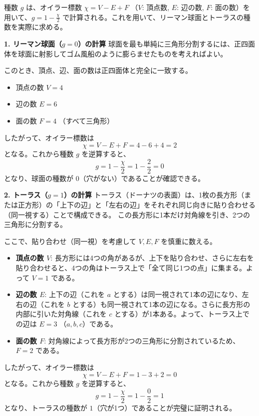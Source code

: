 \begin{example}[球面とトーラスの種数の計算]
    種数 $g$ は、オイラー標数 $\chi = V - E + F$ （$V$: 頂点数, $E$: 辺の数, $F$: 面の数）を用いて、$g = 1 - \frac{\chi}{2}$ で計算される。これを用いて、リーマン球面とトーラスの種数を実際に求める。

    \textbf{1. リーマン球面（$g=0$）の計算}
    球面を最も単純に三角形分割するには、正四面体を球面に射影してゴム風船のように膨らませたものを考えればよい。
    
    このとき、頂点、辺、面の数は正四面体と完全に一致する。
    \begin{itemize}
        \item 頂点の数 $V = 4$
        \item 辺の数 $E = 6$
        \item 面の数 $F = 4$ （すべて三角形）
    \end{itemize}
    したがって、オイラー標数は
    \[
    \chi = V - E + F = 4 - 6 + 4 = 2
    \]
    となる。これから種数 $g$ を逆算すると、
    \[
    g = 1 - \frac{\chi}{2} = 1 - \frac{2}{2} = 0
    \]
    となり、球面の種数が $0$（穴がない）であることが確認できる。

    \textbf{2. トーラス（$g=1$）の計算}
    トーラス（ドーナツの表面）は、1枚の長方形（または正方形）の「上下の辺」と「左右の辺」をそれぞれ同じ向きに貼り合わせる（同一視する）ことで構成できる。
    この長方形に1本だけ対角線を引き、2つの三角形に分割する。
    
    ここで、貼り合わせ（同一視）を考慮して $V, E, F$ を慎重に数える。
    \begin{itemize}
        \item \textbf{頂点の数 $V$}: 長方形には4つの角があるが、上下を貼り合わせ、さらに左右を貼り合わせると、4つの角はトーラス上で「全て同じ1つの点」に集まる。よって $V = 1$ である。
        \item \textbf{辺の数 $E$}: 上下の辺（これを $a$ とする）は同一視されて1本の辺になり、左右の辺（これを $b$ とする）も同一視されて1本の辺になる。さらに長方形の内部に引いた対角線（これを $c$ とする）が1本ある。よって、トーラス上での辺は $E = 3$ （$a, b, c$）である。
        \item \textbf{面の数 $F$}: 対角線によって長方形が2つの三角形に分割されているため、$F = 2$ である。
    \end{itemize}
    したがって、オイラー標数は
    \[
    \chi = V - E + F = 1 - 3 + 2 = 0
    \]
    となる。これから種数 $g$ を逆算すると、
    \[
    g = 1 - \frac{\chi}{2} = 1 - \frac{0}{2} = 1
    \]
    となり、トーラスの種数が $1$（穴が1つ）であることが完璧に証明される。
\end{example}

